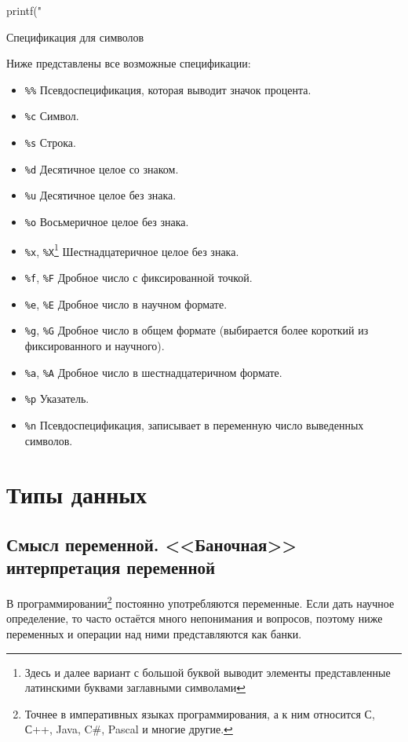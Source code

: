 \documentclass[12pt]{article}
\begin{document}
\begin{listing}[H]
\begin{center}
\begin{ccode}
printf("%
\end{ccode}
\end{center}
\caption{Спецификация для символов}
\label{lst:charspec}
\end{listing}

Ниже представлены все возможные спецификации:
\begin{itemize}
 \item \verb|%%| Псевдоспецификация, которая выводит значок процента.
 \item \verb|%c| Символ.
 \item \verb|%s| Строка.
 \item \verb|%d| Десятичное целое со знаком.
 \item \verb|%u| Десятичное целое без знака.
 \item \verb|%o| Восьмеричное целое без знака.
 \item \verb|%x|, \verb|%X|\footnote{Здесь и далее вариант с большой буквой выводит элементы представленные латинскими буквами заглавными символами} Шестнадцатеричное целое без знака.
 \item \verb|%f|, \verb|%F| Дробное число с фиксированной точкой.
 \item \verb|%e|, \verb|%E| Дробное число в научном формате.
 \item \verb|%g|, \verb|%G| Дробное число в общем формате (выбирается более короткий из фиксированного и научного).
 \item \verb|%a|, \verb|%A| Дробное число в шестнадцатеричном формате.
 \item \verb|%p| Указатель.
 \item \verb|%n| Псевдоспецификация, записывает в переменную число выведенных символов.
\end{itemize}

\section{Типы данных}
\subsection{Смысл переменной. <<Баночная>> интерпретация переменной}
В программировании\footnote{Точнее в императивных языках программирования, а к ним относится С, С++, Java, C#, Pascal и многие другие.} постоянно употребляются переменные. Если дать научное определение, то часто остаётся много непонимания и вопросов, поэтому ниже переменных и операции над ними представляются как банки.
\end{document}
